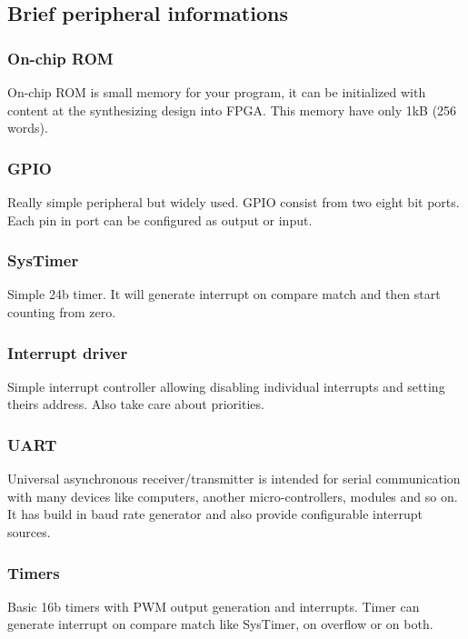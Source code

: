 \subsection{Brief peripheral informations}

\subsubsection{On-chip ROM}

On-chip ROM is small memory for your program, it can be initialized with content
 at the synthesizing design into FPGA. This memory have only 1kB (256 words).

\subsubsection{GPIO}

Really simple peripheral but widely used. GPIO consist from two eight bit ports.
 Each pin in port can be configured as output or input.

\subsubsection{SysTimer}

Simple 24b timer. It will generate interrupt on compare match and then start
counting from zero.

\subsubsection{Interrupt driver}

Simple interrupt controller allowing disabling individual interrupts and
setting theirs address. Also take care about priorities.

\subsubsection{UART}

Universal asynchronous receiver/transmitter is intended for serial communication
with many devices like computers, another micro-controllers, modules and so on.
It has build in baud rate generator and also provide configurable interrupt sources.

\subsubsection{Timers}

Basic 16b timers with PWM output generation and interrupts. Timer can generate
interrupt on compare match like SysTimer, on overflow or on both.

